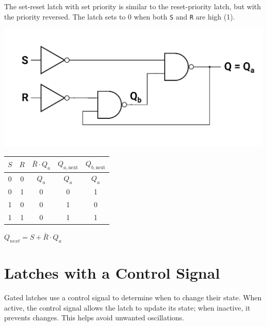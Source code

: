 \documentclass[12pt,openany]{book}
\begin{document}
\begin{justify}
	The set-reset latch with set priority is similar to the reset-priority latch, but with the priority reversed. The latch sets to 0 when both \texttt{S} and \texttt{R} are high (1).
\end{justify}
\vspace*{10px}
\begin{minipage}{0.40\textwidth}
	\begin{center}
		\includegraphics[width=1.2\textwidth]{circuits/12.1.3_3.png}
	\end{center}
\end{minipage}
\hfill
\hspace*{20px}
\vline
\hfill
\begin{minipage}{0.50\textwidth}
	\begin{center}
		\begin{tabular}{|c|c|c||c|c|}
			\hline
			$S$ & $R$ & $\bar{R} \cdot Q_a$ & $Q_{a,\text{next}}$ & $Q_{b,\text{next}}$ \\
			\hline
			0 & 0 & $Q_a$ & $Q_a$ & $Q_a$ \\
			\hline
			0 & 1 & 0 & 0 & 1 \\
			\hline
			1 & 0 & 0 & 1 & 0 \\
			\hline
			1 & 1 & 0 & 1 & 1 \\
			\hline
			\end{tabular}
	\end{center}
\end{minipage}
\newline
$Q_{next} = S + \bar{R} \cdot Q_a$
\newpage
\section{Latches with a Control Signal}

\begin{justify}
	Gated latches use a control signal to determine when to change their state. When active, the control signal allows the latch to update its state; when inactive, it prevents changes. This helps avoid unwanted oscillations.
\end{justify}
\end{document}
